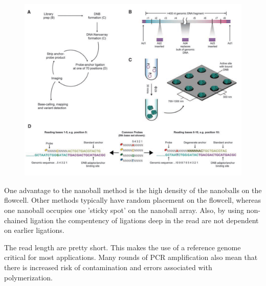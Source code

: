 \documentclass{report}\usepackage[]{graphicx}\usepackage[]{color}
\begin{document}
\begin{figure}[H]
\centering
    \includegraphics[width=.5\textwidth]{images/Nanoball2.pdf}
    \caption{}\label{fig:Nanoball} 
\end{figure}

One advantage to the nanoball method is the high density of the nanoballs on the flowcell.
Other methods typically have random placement on the flowcell, whereas one nanoball occupies
one 'sticky spot' on the nanoball array. Also, by using non-chained ligation the compentency 
of ligations deep in the read are not dependent on earlier ligations. 

The read length are pretty short. This makes the use of a reference genome critical 
for most applications. Many rounds of PCR amplification also mean that there is 
increased risk of contamination and errors associated with polymerization.
\end{document}
